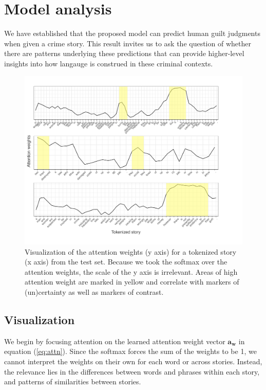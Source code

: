 \documentclass[11pt,a4paper]{article}
\begin{document}
\section{Model analysis}

We have established that the proposed model can predict human guilt judgments when given a crime story. This result invites us to ask the question of whether there are patterns underlying these predictions that can provide higher-level insights into how langauge is construed in these criminal contexts. 

\begin{figure}[t]
  \centering
  \includegraphics[width=1\linewidth]{graphs/attention-marked.pdf}
  \caption{Visualization of the attention weights (y axis) for a tokenized story (x axis) from the test set. Because we took the softmax over the attention weights, the scale of the y axis is irrelevant. Areas of high attention weight are marked in yellow and correlate with markers of (un)certainty as well as markers of contrast.}
  \label{fig:viz}
\end{figure}

\subsection{Visualization}

We begin by focusing attention on the learned attention weight vector $\mathbf{a_{w}}$ in equation (\ref{eq:attn}). Since the softmax forces the sum of the weights to be 1, we cannot interpret the weights on their own for each word or across stories. Instead, the relevance lies in the differences between words and phrases within each story, and patterns of similarities between stories.
\end{document}
